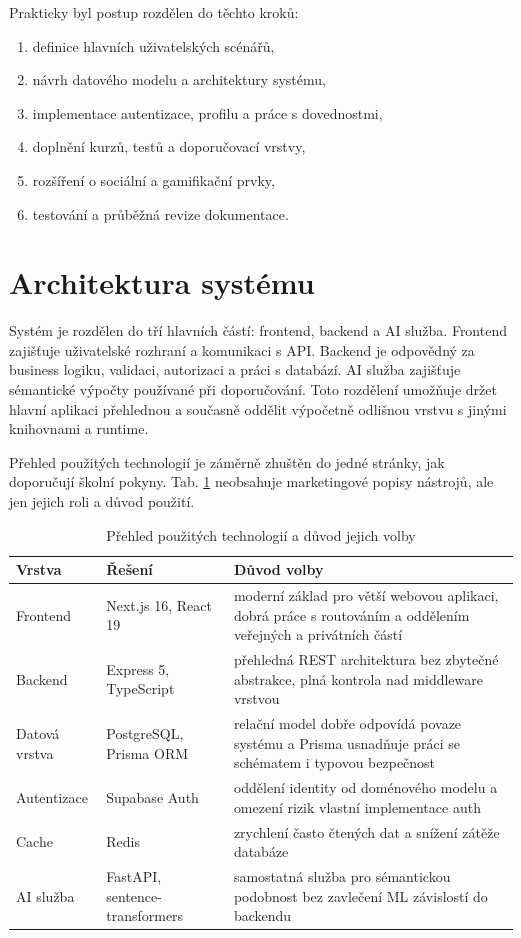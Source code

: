 \documentclass[12pt,a4paper]{report}
\begin{document}
Prakticky byl postup rozdělen do těchto kroků:
\begin{enumerate}
  \item definice hlavních uživatelských scénářů,
  \item návrh datového modelu a architektury systému,
  \item implementace autentizace, profilu a práce s dovednostmi,
  \item doplnění kurzů, testů a doporučovací vrstvy,
  \item rozšíření o sociální a gamifikační prvky,
  \item testování a průběžná revize dokumentace.
\end{enumerate}

\section{Architektura systému}
Systém je rozdělen do tří hlavních částí: frontend, backend a AI služba. Frontend zajišťuje uživatelské rozhraní a komunikaci s API. Backend je odpovědný za business logiku, validaci, autorizaci a práci s databází. AI služba zajišťuje sémantické výpočty používané při doporučování. Toto rozdělení umožňuje držet hlavní aplikaci přehlednou a současně oddělit výpočetně odlišnou vrstvu s jinými knihovnami a runtime.

Přehled použitých technologií je záměrně zhuštěn do jedné stránky, jak doporučují školní pokyny. Tab. \ref{tab:tech} neobsahuje marketingové popisy nástrojů, ale jen jejich roli a důvod použití.

\begin{table}[ht]
\centering
\caption{Přehled použitých technologií a důvod jejich volby}
\label{tab:tech}
\begin{tabularx}{\textwidth}{>{\raggedright\arraybackslash}p{3.1cm} >{\raggedright\arraybackslash}p{3.2cm} X}
\toprule
Vrstva & Řešení & Důvod volby \\
\midrule
Frontend & Next.js 16, React 19 & moderní základ pro větší webovou aplikaci, dobrá práce s routováním a oddělením veřejných a privátních částí \cite{next,react} \\
Backend & Express 5, TypeScript & přehledná REST architektura bez zbytečné abstrakce, plná kontrola nad middleware vrstvou \cite{express} \\
Datová vrstva & PostgreSQL, Prisma ORM & relační model dobře odpovídá povaze systému a Prisma usnadňuje práci se schématem i typovou bezpečnost \cite{prisma} \\
Autentizace & Supabase Auth & oddělení identity od doménového modelu a omezení rizik vlastní implementace auth \cite{supabase} \\
Cache & Redis & zrychlení často čtených dat a snížení zátěže databáze \cite{redis} \\
AI služba & FastAPI, sentence-transformers & samostatná služba pro sémantickou podobnost bez zavlečení ML závislostí do backendu \cite{fastapi,reimers} \\
\bottomrule
\end{tabularx}
\end{table}
\end{document}
